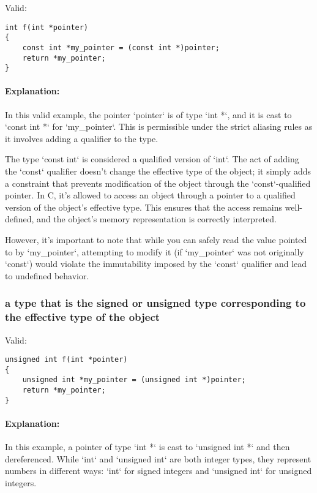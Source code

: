 \documentclass[12pt]{article}
\begin{document}
Valid:

\begin{lstlisting}
int f(int *pointer)
{
    const int *my_pointer = (const int *)pointer;
    return *my_pointer;
}
\end{lstlisting}

\paragraph{Explanation:}
In this valid example, the pointer `pointer` is of type `int *`, and it is cast to `const int *` for `my\_pointer`. This is permissible under the strict aliasing rules as it involves adding a qualifier to the type. 

The type `const int` is considered a qualified version of `int`. The act of adding the `const` qualifier doesn't change the effective type of the object; it simply adds a constraint that prevents modification of the object through the `const`-qualified pointer. In C, it's allowed to access an object through a pointer to a qualified version of the object's effective type. This ensures that the access remains well-defined, and the object's memory representation is correctly interpreted.

However, it's important to note that while you can safely read the value pointed to by `my\_pointer`, attempting to modify it (if `my\_pointer` was not originally `const`) would violate the immutability imposed by the `const` qualifier and lead to undefined behavior.

\subsubsection{a type that is the signed or unsigned type corresponding to the effective type of the object}

Valid:
\begin{lstlisting}
unsigned int f(int *pointer)
{
    unsigned int *my_pointer = (unsigned int *)pointer;
    return *my_pointer;
}
\end{lstlisting}
\paragraph{Explanation:}
In this example, a pointer of type `int *` is cast to `unsigned int *` and then dereferenced. While `int` and `unsigned int` are both integer types, they represent numbers in different ways: `int` for signed integers and `unsigned int` for unsigned integers. 
\end{document}
